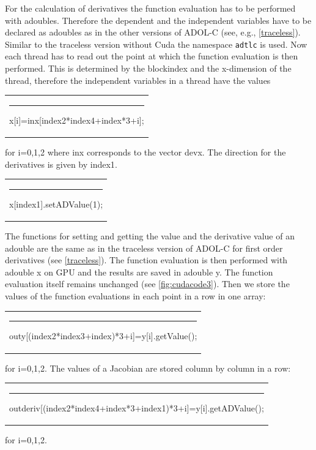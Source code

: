 \documentclass[11pt,twoside]{article}
\begin{document}
For the calculation of derivatives the function evaluation has to be performed
with {\sf adouble}s. Therefore the dependent and the independent variables
have to be declared as {\sf adouble}s as in the other versions of ADOL-C (see, e.g., \autoref{traceless}). 
Similar to the traceless version without Cuda the namespace \verb#adtlc# is used. 
Now each thread has to read out the point at which the function evaluation is 
then performed. This is determined by the blockindex and the x-dimension of 
the thread, therefore the independent variables in a thread
have the values
\begin{center}
  \begin{tabular}{l}
    {\sf \rule{0.5cm}{0pt}x[i]=inx[index2*index4+index*3+i];}\\
  \end{tabular}
\end{center}  
for {\sf i=0,1,2} where {\sf inx} corresponds to the vector {\sf devx}. The direction for 
the derivatives is given by {\sf index1}.
\begin{center}
  \begin{tabular}{l}
     {\sf \rule{0.5cm}{0pt}x[index1].setADValue(1);}\\
  \end{tabular}
\end{center} 
The functions for setting and getting the value and the derivative value of an 
{\sf adouble} are the same as in the traceless version of ADOL-C for first 
order derivatives (see \autoref{traceless}).
The function evaluation is then performed with {\sf adouble x} on GPU and the results
are saved in {\sf adouble y}. The function evaluation itself remains unchanged
(see \autoref{fig:cudacode3}). Then we store the values of the function
evaluations in each point in a row in one array:
\begin{center}
  \begin{tabular}{l}
   {\sf \rule{0.5cm}{0pt}outy[(index2*index3+index)*3+i]=y[i].getValue();}\\
  \end{tabular}
\end{center} 
for {\sf i=0,1,2}. The values of a Jacobian are stored column by column in 
a row:
\begin{center}
  \begin{tabular}{l}
   {\sf \rule{0.5cm}{0pt}outderiv[(index2*index4+index*3+index1)*3+i]=y[i].getADValue();}\\
  \end{tabular}
\end{center} 
for {\sf i=0,1,2}. 
\end{document}
